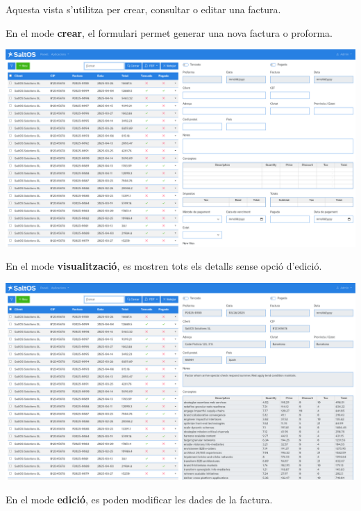 \documentclass[a4paper]{article}
\begin{document}
Aquesta vista s'utilitza per crear, consultar o editar una factura.

En el mode \textbf{crear}, el formulari permet generar una nova factura o proforma.

\begin{center}\includegraphics[width=1\textwidth]{../ujest/snaps/test-screenshots-js-screenshots-sales-invoices-create-ca-es-1-snap.png}\end{center}

En el mode \textbf{visualització}, es mostren tots els detalls sense opció d'edició.

\begin{center}\includegraphics[width=1\textwidth]{../ujest/snaps/test-screenshots-js-screenshots-sales-invoices-view-100-ca-es-1-snap.png}\end{center}

En el mode \textbf{edició}, es poden modificar les dades de la factura.
\end{document}
